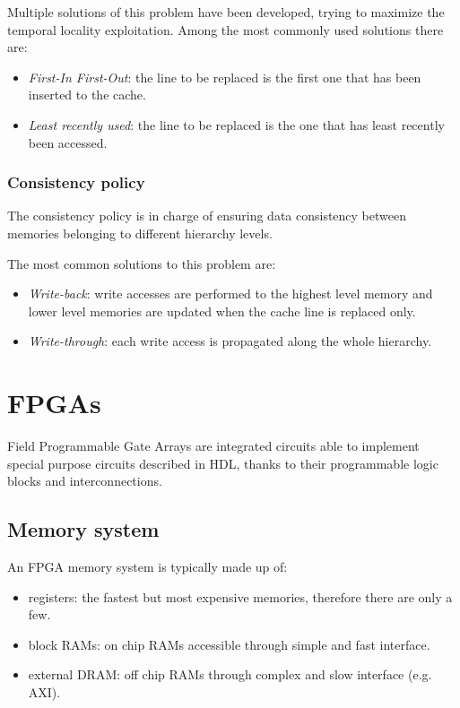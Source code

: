 \documentclass[11pt,a4paper]{memoir}
\begin{document}
Multiple solutions of this problem have been developed, trying to maximize
the temporal locality exploitation.
Among the most commonly used solutions there are:
\begin{itemize}
	\item \emph{First-In First-Out}: the line to be replaced is the first
		one that has been inserted to the cache.
	\item \emph{Least recently used}: the line to be replaced is the one
		that has least recently been accessed.
\end{itemize}

\subsubsection{Consistency policy}
The consistency policy is in charge of ensuring data consistency between memories
belonging to different hierarchy levels.

The most common solutions to this problem are:
\begin{itemize}
	\item \emph{Write-back}: write accesses are performed to the highest
		level memory and lower level memories are updated when the cache
		line is replaced only.
	\item \emph{Write-through}: each write access is propagated along the
		whole hierarchy.
\end{itemize}

\section{FPGAs}
Field Programmable Gate Arrays are integrated circuits able to implement special
purpose circuits described in HDL, thanks to their programmable logic blocks and
interconnections.
\subsection{Memory system}
An FPGA memory system is typically made up of:
\begin{itemize}
	\item registers: the fastest but most expensive memories, therefore
		there are only a few.
	\item block RAMs: on chip RAMs accessible through simple and fast
		interface.
	\item external DRAM: off chip RAMs through complex and slow interface
		(e.g. AXI).
\end{itemize}
\end{document}
